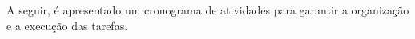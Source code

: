 



A seguir, é apresentado um cronograma de atividades para garantir a organização e a execução das tarefas.

